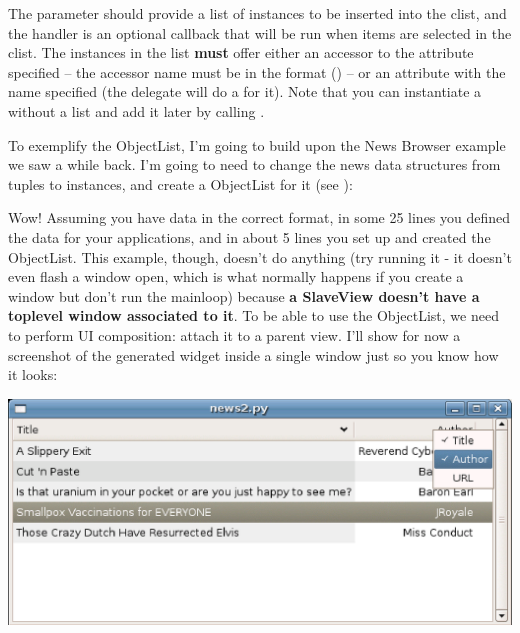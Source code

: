 \documentclass[a4paper]{howto}
\begin{document}
The  parameter should provide a list of instances
to be inserted into the clist, and the handler is an optional callback
that will be run when items are selected in the clist. The instances in
the list {\bf must} offer either an accessor to the attribute specified
-- the accessor name must be in the format () -- or an attribute with the name specified (the
delegate will do a  for it). Note that you can
instantiate a  without a list and add it later by
calling .

To exemplify the ObjectList, I'm going to build upon the News Browser
example we saw a while back. I'm going to need to change the news data
structures from tuples to instances, and create a ObjectList for
it (see ):



Wow! Assuming you have data in the correct format, in some 25 lines you
defined the data for your applications, and in about 5 lines you
set up and created the ObjectList.  This example, though, doesn't do
anything (try running it - it doesn't even flash a window open, which is
what normally happens if you create a window but don't run the mainloop)
because {\bf a SlaveView doesn't have a toplevel window associated to
it}. To be able to use the ObjectList, we need to perform UI
composition: attach it to a parent view. I'll show for now a screenshot
of the generated widget inside a single window just so you know how it
looks:

\begin{center}
\includegraphics[scale=0.88]{images/news2.eps}
\end{center}
\end{document}
